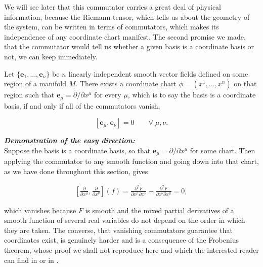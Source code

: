         We will see later that this commutator carries a great deal of physical information, because the Riemann tensor, which tells us about the geometry of the system, can be written in terms of commutators, which makes its independence of any coordinate chart manifest. The second promise we made, that the commutator would tell us whether a given basis is a coordinate basis or not, we can keep immediately.

        \begin{myteo}
            Let $\{\mathbf{e}_1,...,\mathbf{e}_n\}$ be $n$ linearly independent smooth vector fields defined on some region of a manifold $M$. There exists a coordinate chart $\phi = (x^1,...,x^n)$ on that region such that $\mathbf{e}_{\mu} = \partial/\partial x^{\mu}$ for every $\mu$, which is to say the basis is a coordinate basis, if and only if all of the commutators vanish,

            \begin{equation}\label{eq:CoordBasisCriterion}
                \left[\mathbf{e}_{\mu},\mathbf{e}_{\nu}\right] = 0 \qquad \forall\; \mu,\nu.
            \end{equation}
        \end{myteo}

        \textbf{\textit{Demonstration of the easy direction:}}\\

        Suppose the basis is a coordinate basis, so that $\mathbf{e}_{\mu} = \partial/\partial x^{\mu}$ for some chart. Then applying the commutator to any smooth function and going down into that chart, as we have done throughout this section, gives

        \begin{align*}
            \left[\frac{\partial}{\partial x^{\mu}},\frac{\partial}{\partial x^{\nu}}\right](f) = \frac{\partial^2 F}{\partial x^{\mu}\partial x^{\nu}} - \frac{\partial^2 F}{\partial x^{\nu}\partial x^{\mu}} = 0,
        \end{align*}

        which vanishes because $F$ is smooth and the mixed partial derivatives of a smooth function of several real variables do not depend on the order in which they are taken. The converse, that vanishing commutators guarantee that coordinates exist, is genuinely harder and is a consequence of the Frobenius theorem, whose proof we shall not reproduce here and which the interested reader can find in \citet{wald1984} or in \citet{nakahara2003}.

